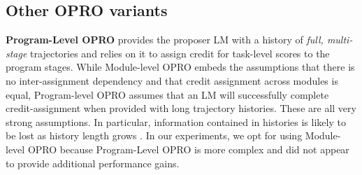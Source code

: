\begin{table}[tp]
\begin{center}
\caption{DSPy Optimizer Benchmark and associated programs. We benchmark our optimizers on seven diverse programs. Additional details are in Appendices~\ref{sec:task_desc} and~\ref{sec:lm-program-appendix}.}
\label{tab:optimizer-benchmark}
\end{center}
\end{table}

\subsection{Other OPRO variants}

\hspace*{\parindent}
\textbf{Program-Level OPRO} provides the proposer LM with a history of \textit{full, multi-stage} trajectories and relies on it to assign credit for task-level scores to the program stages. While Module-level OPRO embeds the assumptions that there is no inter-assignment dependency and that credit assignment across modules is equal, Program-level OPRO assumes that an LM will successfully complete credit-assignment when provided with long trajectory histories. These are all very strong assumptions. In particular, information contained in histories is likely to be lost as history length grows \cite{liang_litm}. In our experiments, we opt for using Module-level OPRO because Program-Level OPRO is more complex and did not appear to provide additional performance gains.

